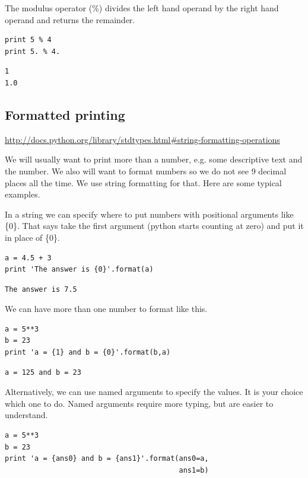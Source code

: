 \documentclass[11pt]{article}
\begin{document}
The modulus operator (\%) divides the left hand operand by the right hand operand and returns the remainder.

\begin{verbatim}
print 5 % 4
print 5. % 4.
\end{verbatim}

\begin{verbatim}
1
1.0
\end{verbatim}


\subsection{Formatted printing}
\label{sec-3-2}
\url{http://docs.python.org/library/stdtypes.html#string-formatting-operations}

We will usually want to print more than a number, e.g. some descriptive text and the number. We also will want to format numbers so we do not see 9 decimal places all the time. We use string formatting for that. Here are some typical examples.

In a string we can specify where to put numbers with positional arguments like \{0\}. That says take the first argument (python starts counting at zero) and put it in place of \{0\}.

\begin{verbatim}
a = 4.5 + 3
print 'The answer is {0}'.format(a)
\end{verbatim}

\begin{verbatim}
The answer is 7.5
\end{verbatim}


We can have more than one number to format like this.
\begin{verbatim}
a = 5**3
b = 23
print 'a = {1} and b = {0}'.format(b,a)
\end{verbatim}

\begin{verbatim}
a = 125 and b = 23
\end{verbatim}

Alternatively, we can use named arguments to specify the values. It is your choice which one to do. Named arguments require more typing, but are easier to understand.
\begin{verbatim}
a = 5**3
b = 23
print 'a = {ans0} and b = {ans1}'.format(ans0=a,
                                         ans1=b)
\end{verbatim}
\end{document}

